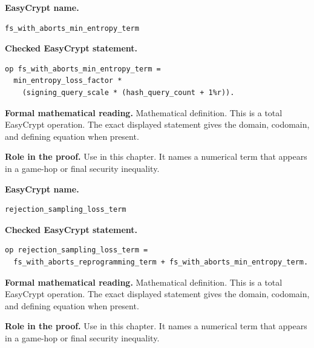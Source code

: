 \begin{formaldefinition}
\noindent\textbf{EasyCrypt name.}
\begin{lstlisting}[language=EasyCrypt,basicstyle=\ttfamily\scriptsize]
fs_with_aborts_min_entropy_term
\end{lstlisting}
\noindent\textbf{Checked EasyCrypt statement.}
\begin{lstlisting}[language=EasyCrypt,basicstyle=\ttfamily\scriptsize]
op fs_with_aborts_min_entropy_term =
  min_entropy_loss_factor *
    (signing_query_scale * (hash_query_count + 1%r)).
\end{lstlisting}
\noindent\textbf{Formal mathematical reading.}
Mathematical definition. This is a total EasyCrypt operation.  The exact displayed statement gives the domain, codomain, and defining equation when present.

\noindent\textbf{Role in the proof.}
Use in this chapter. It names a numerical term that appears in a game-hop or final security inequality.

\end{formaldefinition}

\begin{formaldefinition}
\noindent\textbf{EasyCrypt name.}
\begin{lstlisting}[language=EasyCrypt,basicstyle=\ttfamily\scriptsize]
rejection_sampling_loss_term
\end{lstlisting}
\noindent\textbf{Checked EasyCrypt statement.}
\begin{lstlisting}[language=EasyCrypt,basicstyle=\ttfamily\scriptsize]
op rejection_sampling_loss_term =
  fs_with_aborts_reprogramming_term + fs_with_aborts_min_entropy_term.
\end{lstlisting}
\noindent\textbf{Formal mathematical reading.}
Mathematical definition. This is a total EasyCrypt operation.  The exact displayed statement gives the domain, codomain, and defining equation when present.

\noindent\textbf{Role in the proof.}
Use in this chapter. It names a numerical term that appears in a game-hop or final security inequality.

\end{formaldefinition}

